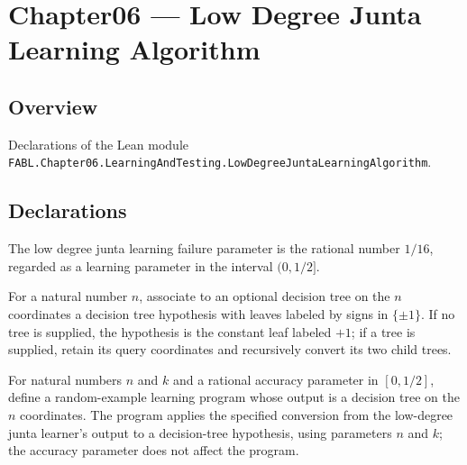 \chapter{Chapter06 — Low Degree Junta Learning Algorithm}
\section{Overview}

Declarations of the Lean module \texttt{FABL.Chapter06.LearningAndTesting.LowDegreeJuntaLearningAlgorithm}.

\section{Declarations}

\begin{definition}
\label{FABL.lowDegreeJuntaLearningFailure}
\leanok
{}
The low degree junta learning failure parameter is the rational number $1/16$, regarded
as a learning parameter in the interval $(0,1/2]$.
\end{definition}

\begin{definition}
\label{FABL.lowDegreeJuntaHypothesisOfOutput}
\leanok
{}
For a natural number $n$, associate to an optional decision tree on the $n$ coordinates
a decision tree hypothesis with leaves labeled by signs in $\{\pm1\}$. If no tree is
supplied, the hypothesis is the constant leaf labeled $+1$; if a tree is supplied,
retain its query coordinates and recursively convert its two child trees.
\end{definition}

\begin{definition}
\label{FABL.lowDegreeJuntaLearningProgram}
\leanok
{}
For natural numbers $n$ and $k$ and a rational accuracy parameter in $[0,1/2]$, define a
random-example learning program whose output is a decision tree on the $n$ coordinates.
The program applies the specified conversion from the low-degree junta learner’s output
to a decision-tree hypothesis, using parameters $n$ and $k$; the accuracy parameter does
not affect the program.
\end{definition}

